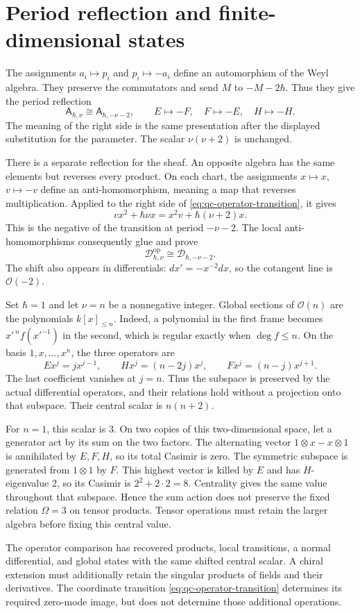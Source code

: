 \section{Period reflection and finite-dimensional states}

The assignments $a_i\mapsto p_i$ and $p_i\mapsto-a_i$ define an automorphism of the Weyl algebra.
They preserve the commutators and send $M$ to $-M-2\hbar$.
Thus they give the period reflection
\[
 \mathsf A_{\hbar,\nu}\cong\mathsf A_{\hbar,-\nu-2},
 \qquad E\mapsto-F,\quad F\mapsto-E,\quad H\mapsto-H.
\]
The meaning of the right side is the same presentation after the displayed substitution for the parameter.
The scalar $\nu(\nu+2)$ is unchanged.

There is a separate reflection for the sheaf.
An opposite algebra has the same elements but reverses every product.
On each chart, the assignments $x\mapsto x$, $v\mapsto-v$ define an anti-homomorphism, meaning a map that reverses multiplication.
Applied to the right side of \eqref{eq:qc-operator-transition}, it gives
\[
 vx^2+\hbar\nu x=x^2v+\hbar(\nu+2)x.
\]
This is the negative of the transition at period $-\nu-2$.
The local anti-homomorphisms consequently glue and prove
\[
 \mathcal D_{\hbar,\nu}^{\mathrm{op}}\cong\mathcal D_{\hbar,-\nu-2}.
\]
The shift also appears in differentials: $dx'=-x^{-2}dx$, so the cotangent line is $\mathcal O(-2)$.

Set $\hbar=1$ and let $\nu=n$ be a nonnegative integer.
Global sections of $\mathcal O(n)$ are the polynomials $k[x]_{\le n}$.
Indeed, a polynomial in the first frame becomes $x'^{\,n}f(x'^{-1})$ in the second, which is regular exactly when $\deg f\le n$.
On the basis $1,x,\ldots,x^n$, the three operators are
\[
 E x^j=jx^{j-1},\qquad
 Hx^j=(n-2j)x^j,\qquad
 Fx^j=(n-j)x^{j+1}.
\]
The last coefficient vanishes at $j=n$.
Thus the subspace is preserved by the actual differential operators, and their relations hold without a projection onto that subspace.
Their central scalar is $n(n+2)$.

For $n=1$, this scalar is $3$.
On two copies of this two-dimensional space, let a generator act by its sum on the two factors.
The alternating vector $1\otimes x-x\otimes1$ is annihilated by $E,F,H$, so its total Casimir is zero.
The symmetric subspace is generated from $1\otimes1$ by $F$.
This highest vector is killed by $E$ and has $H$-eigenvalue $2$, so its Casimir is $2^2+2\cdot2=8$.
Centrality gives the same value throughout that subspace.
Hence the sum action does not preserve the fixed relation $\Omega=3$ on tensor products.
Tensor operations must retain the larger algebra before fixing this central value.

The operator comparison has recovered products, local transitions, a normal differential, and global states with the same shifted central scalar.
A chiral extension must additionally retain the singular products of fields and their derivatives.
The coordinate transition \eqref{eq:qc-operator-transition} determines its required zero-mode image, but does not determine those additional operations.
